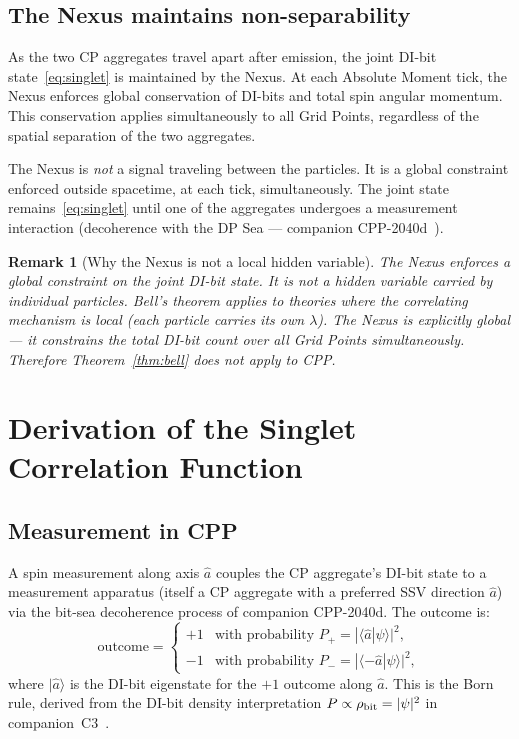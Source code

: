 \documentclass[11pt,a4paper]{article}
\newtheorem{remark}[theorem]{Remark}
\begin{document}
\subsection{The Nexus maintains non-separability}

As the two CP aggregates travel apart after emission, the joint DI-bit
state~\eqref{eq:singlet} is maintained by the Nexus.  At each Absolute
Moment tick, the Nexus enforces global conservation of DI-bits and
total spin angular momentum.  This conservation applies simultaneously
to all Grid Points, regardless of the spatial separation of the two
aggregates.

The Nexus is \emph{not} a signal traveling between the particles.  It
is a global constraint enforced outside spacetime, at each tick,
simultaneously.  The joint state remains~\eqref{eq:singlet} until one
of the aggregates undergoes a measurement interaction (decoherence
with the DP Sea --- companion CPP-2040d~\citep{cpp2040d}).

\begin{remark}[Why the Nexus is not a local hidden variable]
The Nexus enforces a \emph{global constraint} on the joint DI-bit
state.  It is not a hidden variable carried by individual particles.
Bell's theorem applies to theories where the correlating mechanism
is local (each particle carries its own $\lambda$).  The Nexus is
explicitly global --- it constrains the total DI-bit count over all
Grid Points simultaneously.  Therefore Theorem~\ref{thm:bell} does
not apply to CPP.
\end{remark}

\section{Derivation of the Singlet Correlation Function}
\label{sec:correlation}

\subsection{Measurement in CPP}

A spin measurement along axis $\hat{a}$ couples the CP aggregate's
DI-bit state to a measurement apparatus (itself a CP aggregate with
a preferred SSV direction $\hat{a}$) via the bit-sea decoherence
process of companion CPP-2040d.  The outcome is:
\begin{equation}
\text{outcome} = \begin{cases}
+1 & \text{with probability } P_+ = |\langle\hat{a}|\psi\rangle|^2, \\
-1 & \text{with probability } P_- = |\langle{-\hat{a}}|\psi\rangle|^2,
\end{cases}
\label{eq:born}
\end{equation}
where $|\hat{a}\rangle$ is the DI-bit eigenstate for the $+1$ outcome
along $\hat{a}$.  This is the Born rule, derived from the DI-bit density
interpretation $P \propto \rho_{\rm bit} = |\psi|^2$ in
companion~C3~\citep{abshier2026born}.
\end{document}
